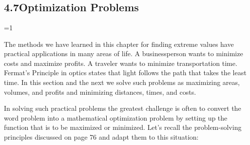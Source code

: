 \documentclass{sebase}
\begin{document}
\chapter[4\quad Applications of Differentiation]{}

\section{4.7\quad Optimization Problems}

\noCCC%
\renewcommand{\ET}{1}%
\renewcommand{\RM}{0}%
\renewcommand{\RM}{1}%
\ifnum \RM=1\setcounter{page}{70}\else \setcounter{page}{57}\fi%

The methods we have learned in this chapter for finding extreme values have
practical applications in many areas of life. A businessperson wants to
minimize costs and maximize profits. A traveler wants to minimize
transportation time. Fermat's Principle in optics states that light follows
the path that takes the least time. In this section and the next we solve
such problems as maximizing areas, volumes, and profits and minimizing
distances, times, and costs.

In solving such practical problems the greatest challenge is often to
convert the word problem into a mathematical optimization problem by setting
up the function that is to be maximized or minimized. Let's recall the
problem-solving principles discussed on page 
76
and adapt them to this situation:\vspace{12pt}

\noindent {}
\end{document}
